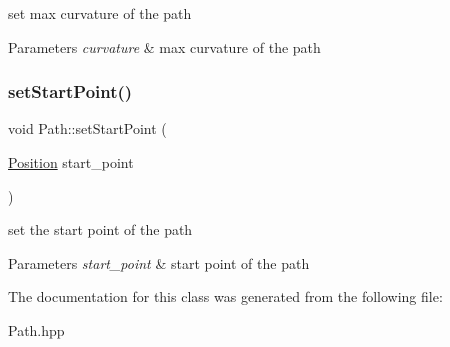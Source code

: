 set max curvature of the path 


\begin{DoxyParams}{Parameters}
{\em curvature} & max curvature of the path \\
\hline
\end{DoxyParams}
\mbox{\label{class_path_a87f4082a3c5af3aa37260cb99c605156}} 
\subsubsection{\texorpdfstring{set\+Start\+Point()}{setStartPoint()}}
{\footnotesize\ttfamily void Path\+::set\+Start\+Point (\begin{DoxyParamCaption}\item[{\mbox{\hyperlink{class_position}{Position}}}]{start\+\_\+point }\end{DoxyParamCaption})}



set the start point of the path 


\begin{DoxyParams}{Parameters}
{\em start\+\_\+point} & start point of the path \\
\hline
\end{DoxyParams}


The documentation for this class was generated from the following file\+:\begin{DoxyCompactItemize}
\item 
Path.\+hpp\end{DoxyCompactItemize}
